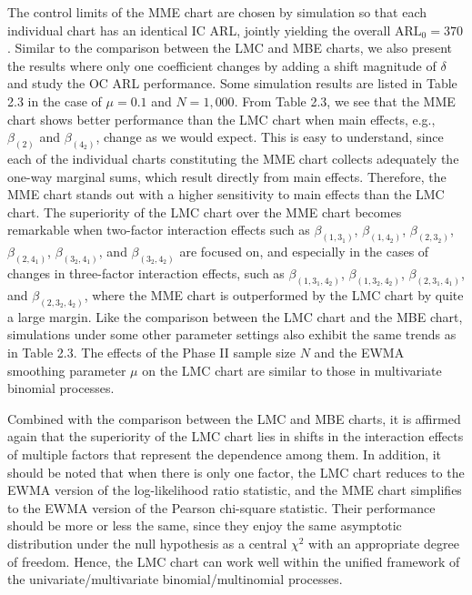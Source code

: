 The control limits of the MME chart are chosen by simulation so that each individual
chart has an identical IC ARL, jointly yielding the overall $\mbox{ARL}_0=370$.
Similar to the comparison between the LMC and MBE charts, we also present the
results where only one coefficient changes by adding a shift magnitude of $\delta$
and study the OC ARL performance. Some simulation results are listed in Table 2.3 in
the case of $\mu=0.1$ and $N=1,000$. From Table 2.3, we see that the MME chart shows
better performance than the LMC chart when main effects, e.g., $\beta_{(2)}$ and
$\beta_{(4_2)}$, change as we would expect. This is easy to understand, since each
of the individual charts constituting the MME chart collects adequately the one-way
marginal sums, which result directly from main effects. Therefore, the MME chart
stands out with a higher sensitivity to main effects than the LMC chart. The
superiority of the LMC chart over the MME chart becomes remarkable when two-factor
interaction effects such as $\beta_{(1,3_1)}$, $\beta_{(1,4_2)}$, $\beta_{(2,3_2)}$,
$\beta_{(2,4_1)}$, $\beta_{(3_2,4_1)}$, and $\beta_{(3_2,4_2)}$ are focused on, and
especially in the cases of changes in three-factor interaction effects, such as
$\beta_{(1,3_1,4_2)}$, $\beta_{(1,3_2,4_2)}$, $\beta_{(2,3_1,4_1)}$, and
$\beta_{(2,3_2,4_2)}$, where the MME chart is outperformed by the LMC chart by quite
a large margin. Like the comparison between the LMC chart and the MBE chart,
simulations under some other parameter settings also exhibit the same trends as in
Table 2.3. The effects of the Phase II sample size $N$ and the EWMA smoothing
parameter $\mu$ on the LMC chart are similar to those in multivariate binomial
processes.

Combined with the comparison between the LMC and MBE charts, it is affirmed again
that the superiority of the LMC chart lies in shifts in the interaction effects of
multiple factors that represent the dependence among them. In addition, it should be
noted that when there is only one factor, the LMC chart reduces to the EWMA version
of the log-likelihood ratio statistic, and the MME chart simplifies to the EWMA
version of the Pearson chi-square statistic. Their performance should be more or
less the same, since they enjoy the same asymptotic distribution under the null
hypothesis as a central $\chi^2$ with an appropriate degree of freedom. Hence, the
LMC chart can work well within the unified framework of the univariate/multivariate
binomial/multinomial processes.



